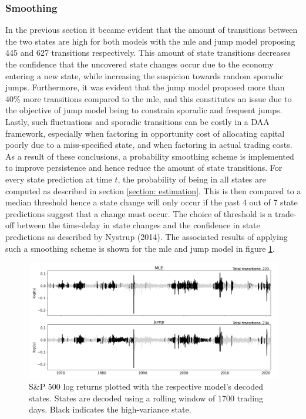 \subsubsection{Smoothing}
In the previous section it became evident that the amount of transitions between the two states are high for both models with the mle and jump model proposing 445 and 627 transitions respectively. This amount of state transitions decreases the confidence that the uncovered state changes occur due to the economy entering a new state, while increasing the suspicion towards random sporadic jumps. Furthermore, it was evident that the jump model proposed more than 40\% more transitions compared to the mle, and this constitutes an issue due to the objective of jump model being to constrain sporadic and frequent jumps. Lastly, such fluctuations and sporadic transitions can be costly in a DAA framework, especially when factoring in opportunity cost of allocating capital poorly due to a miss-specified state, and when factoring in actual trading costs. As a result of these conclusions, a probability smoothing scheme is implemented to improve persistence and hence reduce the amount of state transitions. For every state prediction at time $t$, the probability of being in all states are computed as described in section \ref{section: estimation}. This is then compared to a median threshold hence a state change will only occur if the past 4 out of 7 state predictions suggest that a change must occur. The choice of threshold is a trade-off between the time-delay in state changes and the confidence in state predictions as described by Nystrup (2014). The associated results of applying such a smoothing scheme is shown for the mle and jump model in figure \ref{fig:stylized_facts_decoded_states_filtered}.

\begin{figure}[H] 
    \centering
    \includegraphics[width=1.0\textwidth]{analysis/stylized_facts/images/decoded_states_filter.png}
    \caption{S\&P 500 log returns plotted with the respective model's decoded states. States are decoded using a rolling window of 1700 trading days.  Black indicates the high-variance state.}
    \label{fig:stylized_facts_decoded_states_filtered} 
\end{figure}

